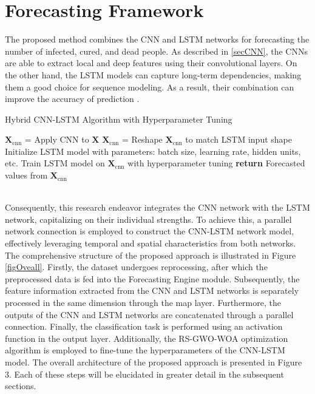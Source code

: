 \documentclass{article}
\begin{document}
\section{Forecasting Framework}\label{SecForecasting}
The proposed method combines the CNN and LSTM networks for forecasting the number of infected, cured, and dead people. As described in \ref{secCNN}, the CNNs are able to extract local and deep features using their convolutional layers. On the other hand, the LSTM models can capture long-term dependencies, making them a good choice for sequence modeling. As a result, their combination can improve the accuracy of prediction \cite{guo2020short}. \\
\IncMargin{1em}
\begin{algorithm2e}
\SetAlgoLined
\caption{Hybrid CNN-LSTM Algorithm with Hyperparameter Tuning}
\label{alg:hybrid_cnn_lstm}
\BlankLine
{}
\BlankLine
$\mathbf{X}_{\text{cnn}}$ = Apply CNN to $\mathbf{X}$\;
$\mathbf{X}_{\text{cnn}}$ = Reshape $\mathbf{X}_{\text{cnn}}$ to match LSTM input shape\;
Initialize LSTM model with parameters: batch size, learning rate, hidden units, etc.\;
Train LSTM model on $\mathbf{X}_{\text{cnn}}$ with hyperparameter tuning\;
\BlankLine
{}
\BlankLine
\textbf{return} Forecasted values from $\mathbf{X}_{\text{cnn}}$
\end{algorithm2e}\\
Consequently, this research endeavor integrates the CNN network with the LSTM network, capitalizing on their individual strengths. To achieve this, a parallel network connection is employed to construct the CNN-LSTM network model, effectively leveraging temporal and spatial characteristics from both networks. The comprehensive structure of the proposed approach is illustrated in  Figure \ref{figOveall}. Firstly, the dataset undergoes reprocessing, after which the preprocessed data is fed into the Forecasting Engine module. Subsequently, the feature information extracted from the CNN and LSTM networks is separately processed in the same dimension through the map layer. Furthermore, the outputs of the CNN and LSTM networks are concatenated through a parallel connection. Finally, the classification task is performed using an activation function in the output layer. Additionally, the RS-GWO-WOA optimization algorithm is employed to fine-tune the hyperparameters of the CNN-LSTM model. The overall architecture of the proposed approach is presented in Figure 3. Each of these steps will be elucidated in greater detail in the subsequent sections.
\end{document}
